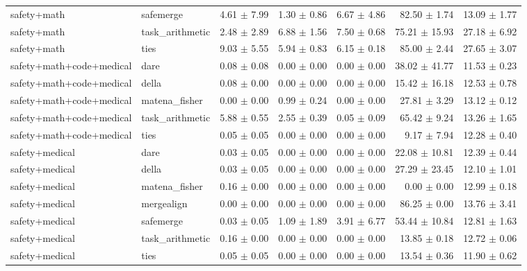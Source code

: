 \documentclass{article}
\begin{document}
\begin{table}[H]
{\begin{tabular}{llrrrrr}
safety+math & safemerge & 4.61 $\pm$ 7.99 & 1.30 $\pm$ 0.86 & 6.67 $\pm$ 4.86 & 82.50 $\pm$ 1.74 & 13.09 $\pm$ 1.77 \\
safety+math & task\_arithmetic & 2.48 $\pm$ 2.89 & 6.88 $\pm$ 1.56 & 7.50 $\pm$ 0.68 & 75.21 $\pm$ 15.93 & 27.18 $\pm$ 6.92 \\
safety+math & ties & 9.03 $\pm$ 5.55 & 5.94 $\pm$ 0.83 & 6.15 $\pm$ 0.18 & 85.00 $\pm$ 2.44 & 27.65 $\pm$ 3.07 \\
safety+math+code+medical & dare & 0.08 $\pm$ 0.08 & 0.00 $\pm$ 0.00 & 0.00 $\pm$ 0.00 & 38.02 $\pm$ 41.77 & 11.53 $\pm$ 0.23 \\
safety+math+code+medical & della & 0.08 $\pm$ 0.00 & 0.00 $\pm$ 0.00 & 0.00 $\pm$ 0.00 & 15.42 $\pm$ 16.18 & 12.53 $\pm$ 0.78 \\
safety+math+code+medical & matena\_fisher & 0.00 $\pm$ 0.00 & 0.99 $\pm$ 0.24 & 0.00 $\pm$ 0.00 & 27.81 $\pm$ 3.29 & 13.12 $\pm$ 0.12 \\
safety+math+code+medical & task\_arithmetic & 5.88 $\pm$ 0.55 & 2.55 $\pm$ 0.39 & 0.05 $\pm$ 0.09 & 65.42 $\pm$ 9.24 & 13.26 $\pm$ 1.65 \\
safety+math+code+medical & ties & 0.05 $\pm$ 0.05 & 0.00 $\pm$ 0.00 & 0.00 $\pm$ 0.00 & 9.17 $\pm$ 7.94 & 12.28 $\pm$ 0.40 \\
safety+medical & dare & 0.03 $\pm$ 0.05 & 0.00 $\pm$ 0.00 & 0.00 $\pm$ 0.00 & 22.08 $\pm$ 10.81 & 12.39 $\pm$ 0.44 \\
safety+medical & della & 0.03 $\pm$ 0.05 & 0.00 $\pm$ 0.00 & 0.00 $\pm$ 0.00 & 27.29 $\pm$ 23.45 & 12.10 $\pm$ 1.01 \\
safety+medical & matena\_fisher & 0.16 $\pm$ 0.00 & 0.00 $\pm$ 0.00 & 0.00 $\pm$ 0.00 & 0.00 $\pm$ 0.00 & 12.99 $\pm$ 0.18 \\
safety+medical & mergealign & 0.00 $\pm$ 0.00 & 0.00 $\pm$ 0.00 & 0.00 $\pm$ 0.00 & 86.25 $\pm$ 0.00 & 13.76 $\pm$ 3.41 \\
safety+medical & safemerge & 0.03 $\pm$ 0.05 & 1.09 $\pm$ 1.89 & 3.91 $\pm$ 6.77 & 53.44 $\pm$ 10.84 & 12.81 $\pm$ 1.63 \\
safety+medical & task\_arithmetic & 0.16 $\pm$ 0.00 & 0.00 $\pm$ 0.00 & 0.00 $\pm$ 0.00 & 13.85 $\pm$ 0.18 & 12.72 $\pm$ 0.06 \\
safety+medical & ties & 0.05 $\pm$ 0.05 & 0.00 $\pm$ 0.00 & 0.00 $\pm$ 0.00 & 13.54 $\pm$ 0.36 & 11.90 $\pm$ 0.62 \\
\bottomrule
\end{tabular}
}
\end{table}
\end{document}
